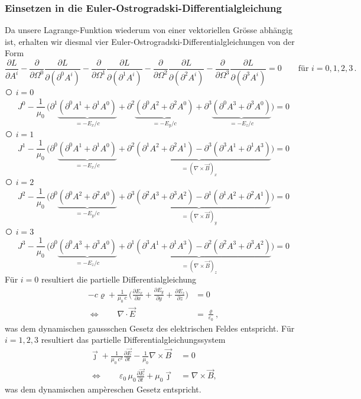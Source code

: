 \subsubsection{Einsetzen in die Euler-Ostrogradski-Differentialgleichung}
Da unsere Lagrange-Funktion wiederum von einer vektoriellen Grösse abhängig ist, erhalten wir diesmal vier Euler-Ostrogradski-Differentialgleichungen von der Form
\[
\frac{\partial L}{\partial A^i} 
- \frac{\partial}{\partial \Omega^0}\frac{\partial L}{\partial(\partial^0 A^i)}
- \frac{\partial}{\partial \Omega^1}\frac{\partial L}{\partial(\partial^1 A^i)}
- \frac{\partial}{\partial \Omega^2}\frac{\partial L}{\partial(\partial^2 A^i)}
- \frac{\partial}{\partial \Omega^3}\frac{\partial L}{\partial(\partial^3 A^i)}
= 0 \qquad \text{für } i=0,1,2,3 \,.
\]
{\larger\textcircled{}} $i = 0$
\[
J^0  -\frac{1}{\mu_0}\,\biggl(\partial^1\underbrace{\left(\partial^0 A^1 + \partial^1 A^0\right)}_{\displaystyle=-E_x/c}
+ \partial^2\underbrace{\left(\partial^0 A^2 + \partial^2 A^0\right)}_{\displaystyle=-E_y/c}
+ \partial^3\underbrace{\left(\partial^0 A^3 + \partial^3 A^0\right)}_{\displaystyle=-E_z/c}\biggr)
=
0
\]
{\larger\textcircled{}} $i = 1$
\[
J^1  -\frac{1}{\mu_0}\,\biggl(\partial^0\underbrace{\left(\partial^0 A^1 + \partial^1 A^0\right)}_{\displaystyle=-E_x/c}
+ \underbrace{\partial^2\left(\partial^1 A^2 + \partial^2 A^1\right)
	- \partial^3\left(\partial^3 A^1 + \partial^1 A^3\right)}_{\displaystyle=(\nabla\times\vec{B})_x}\biggr)
=
0
\]
{\larger\textcircled{}} $i = 2$
\[
J^2  -\frac{1}{\mu_0}\,\biggl(\partial^0\underbrace{\left(\partial^0 A^2 + \partial^2 A^0\right)}_{\displaystyle=-E_y/c}
+ \underbrace{\partial^3\left(\partial^2 A^3 + \partial^3 A^2\right)
	- \partial^1\left(\partial^1 A^2 + \partial^2 A^1\right)}_{\displaystyle=(\nabla\times\vec{B})_y}\biggr)
=
0
\]
{\larger\textcircled{}} $i = 3$
\[
J^3  -\frac{1}{\mu_0}\,\biggl(\partial^0\underbrace{\left(\partial^0 A^3 + \partial^3 A^0\right)}_{\displaystyle=-E_z/c}
+ \underbrace{\partial^1\left(\partial^3 A^1 + \partial^1 A^3\right)
	- \partial^2\left(\partial^2 A^3 + \partial^3 A^2\right)}_{\displaystyle=(\nabla\times\vec{B})_z}\biggr)
=
0
\]
Für $i=0$ resultiert die partielle Differentialgleichung
\begin{align}
-c\varrho + \frac{1}{\mu_0\,c}\,\biggl(\frac{\partial E_x}{\partial x}
+ \frac{\partial E_y}{\partial y} + \frac{\partial E_z}{\partial z}\biggr)
&=
0\\[1em]
\Leftrightarrow \qquad \nabla\cdot\vec{E}
&=
\frac{\varrho}{\varepsilon_0},
\label{maxwell:section:gauss_dynamisch}
\end{align}
was dem dynamischen gaussschen Gesetz des elektrischen Feldes entspricht.
Für $i=1,2,3$ resultiert das partielle Differentialgleichungssystem
\begin{align}
\vec{\jmath} + \frac{1}{\mu_0\,c^2}\frac{\partial \vec{E}}{\partial t}
- \frac{1}{\mu_0}\nabla\times\vec{B}
&=
0\\[1em]
\Leftrightarrow \qquad \varepsilon_0\,\mu_0\frac{\partial \vec{E}}{\partial t} + \mu_0\vec{\jmath}
&=
\nabla\times\vec{B},
\label{maxwell:section:ampere_dynamisch}
\end{align}
was dem dynamischen ampèreschen Gesetz entspricht.
 
